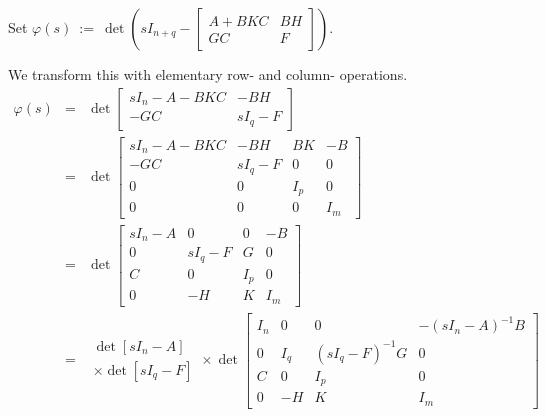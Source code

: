 \documentclass[12pt]{article}
\begin{document}
\smallskip


\bigskip

Set ${\displaystyle 
   \varphi(s)\ :=\ \det\left( s I_{n+q} -
   \left[\begin{array}{cc}A+BKC&BH\\GC&F\end{array}\right]\right)}$.

We transform this with elementary row- and column- operations.
%
\begin{eqnarray*}
  \varphi(s)&=& 
   \det\left[\begin{array}{cc}sI_n-A-BKC&-BH\\-GC&sI_q-F\end{array}\right]\\
  &=&
   \det\left[\begin{array}{cccc}
        sI_n-A-BKC&  -BH & BK& -B \\
           -GC    &sI_q-F& 0 &  0 \\
            0     &   0  &I_p&  0 \\
            0     &   0  & 0 & I_m  \end{array}\right]  \\
  &=&
   \det\left[\begin{array}{cccc}
        sI_n-A &   0  & 0 & -B \\
           0   &sI_q-F& G &  0 \\
           C   &   0  &I_p&  0 \\
           0   &  -H  & K & I_m  \end{array}\right]  \\
  &=&
   \begin{array}{l} \det[sI_n-A]\\
                    \times \det[sI_q-F] \end{array}
    \times 
    \det\left[\begin{array}{cccc}
        I_n & 0 &       0      &-(sI_n-A)^{-1}B \\
         0  &I_q&(sI_q-F)^{-1}G&       0        \\
         C  & 0 &      I_p     &       0        \\
         0  &-H &       K      &      I_m    \end{array}\right]  \\

\end{eqnarray*}
\end{document}

